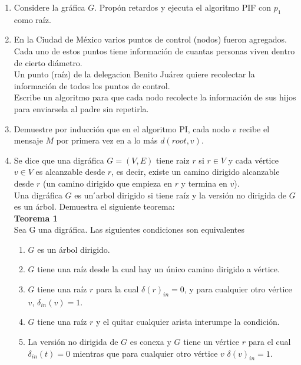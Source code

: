 \documentclass[12pt,a4paper]{report}
\begin{document}
\begin{enumerate}
	\item {
		Considere la gráfica $G$. Propón retardos y ejecuta el algoritmo PIF con
		$p_1$ como raíz.\\
	}

	\item {
		En la Ciudad de México varios puntos de control (nodos) fueron agregados.\\
		Cada uno de estos puntos tiene información de cuantas personas viven
		dentro de cierto diámetro. \\
		Un punto (raíz) de la delegacion Benito Juárez quiere recolectar la
		información de todos los puntos de control. \\
		Escribe un algoritmo para que cada nodo recolecte la información de sus
		hijos para enviarsela al padre sin repetirla.\\
		}

	\item{
		Demuestre por inducción que en el algoritmo PI, cada nodo $v$ recibe el
		mensaje $M$ por primera vez en a lo más $d(root, v)$.\\
	}
	\item{
		Se dice que una digráfica $G = (V, E)$ tiene raiz $r$ si $r \in V$ y cada
		vértice $v \in V$ es alcanzable desde $r$, es decir, existe un camino
		dirigido alcanzable desde $r$ (un camino dirigido que empieza en $r$ y
		termina en $v$).\\
		Una digráfica $G$ es un  ́arbol dirigido si tiene raíz y la versión no dirigida
		de $G$ es un árbol. Demuestra el siguiente teorema:\\

		\textbf{Teorema 1}\\
		Sea G una digráfica. Las siguientes condiciones son equivalentes
		\begin{enumerate} [label = \alph*)]
			\item {
				$G$ es un árbol dirigido.\\
			}
			\item {
				$G$ tiene una raíz desde la cual hay un único camino dirigido a
				vértice.\\
			}

			\item{
				$G$ tiene una raíz $r$ para la cual $\delta(r)_{in} = 0$, y para cualquier
				otro vértice $v$, $\delta_{in}(v) = 1$.\\
			}

			\item{
				$G$ tiene una raíz $r$ y el quitar cualquier arista interumpe la
				condición.
			}
			\item{
				La versión no dirigida de $G$ es conexa y $G$ tiene un vértice $r$ para
				el cual $\delta_{in}(t) = 0$ mientras que para cualquier otro vértice
				$v$ $\delta(v)_{in} = 1$.
			}
		\end{enumerate}
	}

\end{enumerate}
\end{document}
